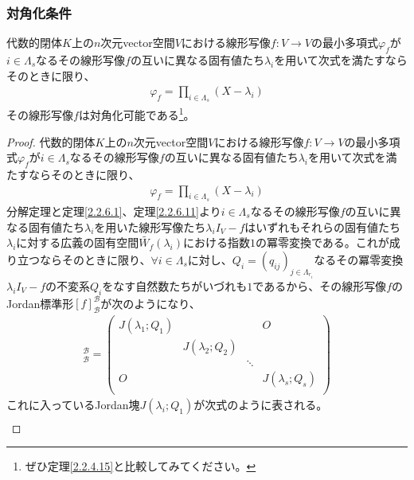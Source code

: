 \documentclass[dvipdfmx]{jsarticle}
\begin{document}
\subsubsection{対角化条件}%
\begin{thm}[対角化条件]\label{2.2.6.12}
代数的閉体$K$上の$n$次元vector空間$V$における線形写像$f:V \rightarrow V$の最小多項式$\varphi_{f}$が$i \in \varLambda_{s}$なるその線形写像$f$の互いに異なる固有値たち$\lambda_{i}$を用いて次式を満たすならそのときに限り、
\begin{align*}
\varphi_{f} = \prod_{i \in \varLambda_{s}} \left( X - \lambda_{i} \right)
\end{align*}
その線形写像$f$は対角化可能である\footnote{ぜひ定理\ref{2.2.4.15}と比較してみてください。}。
\end{thm}
\begin{proof}
代数的閉体$K$上の$n$次元vector空間$V$における線形写像$f:V \rightarrow V$の最小多項式$\varphi_{f}$が$i \in \varLambda_{s}$なるその線形写像$f$の互いに異なる固有値たち$\lambda_{i}$を用いて次式を満たすならそのときに限り、
\begin{align*}
\varphi_{f} = \prod_{i \in \varLambda_{s}} \left( X - \lambda_{i} \right)
\end{align*}
分解定理と定理\ref{2.2.6.1}、定理\ref{2.2.6.11}より$i \in \varLambda_{s}$なるその線形写像$f$の互いに異なる固有値たち$\lambda_{i}$を用いた線形写像たち$\lambda_{i}I_{V} - f$はいずれもそれらの固有値たち$\lambda_{i}$に対する広義の固有空間$\widetilde{W_{f}}\left( \lambda_{i} \right)$における指数$1$の冪零変換である。これが成り立つならそのときに限り、$\forall i \in \varLambda_{s}$に対し、$Q_{i} = \left( q_{ij} \right)_{j \in \varLambda_{r_{i}}}$なるその冪零変換$\lambda_{i}I_{V} - f$の不変系$Q_{i}$をなす自然数たちがいづれも$1$であるから、その線形写像$f$のJordan標準形$[ f]_{\mathcal{B}}^{\mathcal{B}}$が次のようになり、
\begin{align*}
[ f]_{\mathcal{B}}^{\mathcal{B}} = \begin{pmatrix}
J\left( \lambda_{1};Q_{1} \right) & \  & \  & O \\
\  & J\left( \lambda_{2};Q_{2} \right) & \  & \  \\
\  & \  & \ddots & \  \\
O & \  & \  & J\left( \lambda_{s};Q_{s} \right) \\
\end{pmatrix}
\end{align*}
これに入っているJordan塊$J\left( \lambda_{i};Q_{1} \right)$が次式のように表される。
\begin{align*}

\end{align*}
\end{proof}
\end{document}
